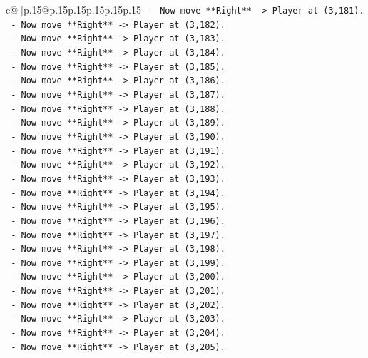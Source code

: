 \documentclass{article}
\begin{document}
{\begin{supertabular}{c@{$\;$}|p{.15\linewidth}@{}p{.15\linewidth}p{.15\linewidth}p{.15\linewidth}p{.15\linewidth}p{.15\linewidth}}
{{{\texttt{    {-}   Now move **Right** {-}> Player at (3,181).} \\
\texttt{    {-}   Now move **Right** {-}> Player at (3,182).} \\
\texttt{    {-}   Now move **Right** {-}> Player at (3,183).} \\
\texttt{    {-}   Now move **Right** {-}> Player at (3,184).} \\
\texttt{    {-}   Now move **Right** {-}> Player at (3,185).} \\
\texttt{    {-}   Now move **Right** {-}> Player at (3,186).} \\
\texttt{    {-}   Now move **Right** {-}> Player at (3,187).} \\
\texttt{    {-}   Now move **Right** {-}> Player at (3,188).} \\
\texttt{    {-}   Now move **Right** {-}> Player at (3,189).} \\
\texttt{    {-}   Now move **Right** {-}> Player at (3,190).} \\
\texttt{    {-}   Now move **Right** {-}> Player at (3,191).} \\
\texttt{    {-}   Now move **Right** {-}> Player at (3,192).} \\
\texttt{    {-}   Now move **Right** {-}> Player at (3,193).} \\
\texttt{    {-}   Now move **Right** {-}> Player at (3,194).} \\
\texttt{    {-}   Now move **Right** {-}> Player at (3,195).} \\
\texttt{    {-}   Now move **Right** {-}> Player at (3,196).} \\
\texttt{    {-}   Now move **Right** {-}> Player at (3,197).} \\
\texttt{    {-}   Now move **Right** {-}> Player at (3,198).} \\
\texttt{    {-}   Now move **Right** {-}> Player at (3,199).} \\
\texttt{    {-}   Now move **Right** {-}> Player at (3,200).} \\
\texttt{    {-}   Now move **Right** {-}> Player at (3,201).} \\
\texttt{    {-}   Now move **Right** {-}> Player at (3,202).} \\
\texttt{    {-}   Now move **Right** {-}> Player at (3,203).} \\
\texttt{    {-}   Now move **Right** {-}> Player at (3,204).} \\
\texttt{    {-}   Now move **Right** {-}> Player at (3,205).} \\
}}}
\end{supertabular}}
\end{document}
